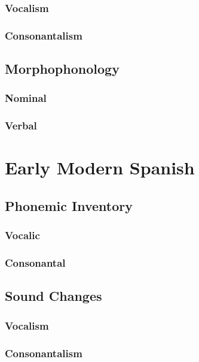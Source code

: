\documentclass{report}
\begin{document}
\subsection{Vocalism}

\subsection{Consonantalism}

\section{Morphophonology}

\subsection{Nominal}

\subsection{Verbal}

\chapter{Early Modern Spanish}


\section{Phonemic Inventory}

\subsection{Vocalic}

\subsection{Consonantal}

\section{Sound Changes}

\subsection{Vocalism}

\subsection{Consonantalism}
\end{document}
